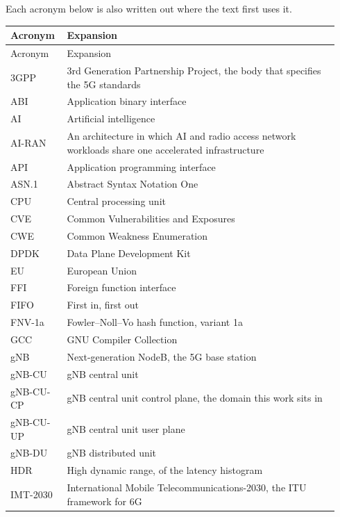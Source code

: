 \documentclass[english,oneside,a4paper,censored,csm,software-track-2020]{HYthesisML}
\begin{document}
\chapter*{\nomname}
\markboth{\nomname}{\nomname}

\noindent Each acronym below is also written out where the text first uses it.

\begingroup
\singlespacing
\footnotesize
\renewcommand{\arraystretch}{1.15}
\begin{longtable}{@{}p{0.15\linewidth} p{0.79\linewidth}@{}}
\hline\hline
Acronym & Expansion \\
\hline
\endfirsthead
\hline\hline
Acronym & Expansion \\
\hline
\endhead
3GPP & 3rd Generation Partnership Project, the body that specifies the 5G standards \\
ABI & Application binary interface \\
AI & Artificial intelligence \\
AI-RAN & An architecture in which AI and radio access network workloads share one accelerated infrastructure \\
API & Application programming interface \\
ASN.1 & Abstract Syntax Notation One \\
CPU & Central processing unit \\
CVE & Common Vulnerabilities and Exposures \\
CWE & Common Weakness Enumeration \\
DPDK & Data Plane Development Kit \\
EU & European Union \\
FFI & Foreign function interface \\
FIFO & First in, first out \\
FNV-1a & Fowler--Noll--Vo hash function, variant 1a \\
GCC & GNU Compiler Collection \\
gNB & Next-generation NodeB, the 5G base station \\
gNB-CU & gNB central unit \\
gNB-CU-CP & gNB central unit control plane, the domain this work sits in \\
gNB-CU-UP & gNB central unit user plane \\
gNB-DU & gNB distributed unit \\
HDR & High dynamic range, of the latency histogram \\
IMT-2030 & International Mobile Telecommunications-2030, the ITU framework for 6G \\

\end{longtable}
\end{document}
